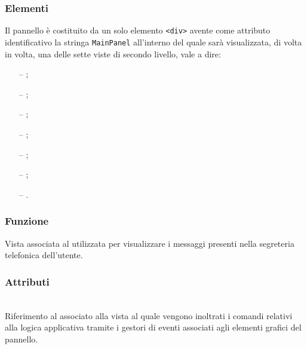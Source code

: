 \subsubsection*{Elementi}
Il pannello è costituito da un solo elemento \verb'<div>' avente come attributo identificativo la stringa \verb'MainPanel' all'interno del quale sarà visualizzata, di volta in volta, una delle sette viste di secondo livello, vale a dire:
\begin{itemize}
  \item[--] ;
  \item[--] ;
  \item[--] ;
  \item[--] ;
  \item[--] ;
  \item[--] ;
  \item[--] .
\end{itemize}


\subsubsection*{Funzione}
Vista associata al   utilizzata per visualizzare i messaggi presenti nella segreteria telefonica dell'utente.

\subsubsection*{Attributi}
\begin{description}
  \item{}\\
  Riferimento al  associato alla vista al quale vengono inoltrati i comandi relativi alla logica applicativa tramite i gestori di eventi associati agli elementi grafici del pannello.
\end{description}

